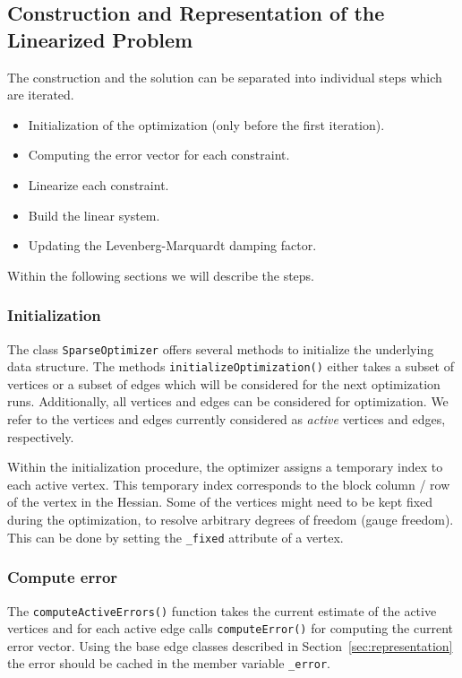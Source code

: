 \documentclass[a4paper]{article}
\begin{document}
\subsection{Construction and Representation of the Linearized Problem}
The construction and the solution can be separated into individual
steps which are iterated.
\begin{itemize}
  \item Initialization of the optimization (only before the first
    iteration).
  \item Computing the error vector for each constraint.
  \item Linearize each constraint.
  \item Build the linear system.
  \item Updating the Levenberg-Marquardt damping factor.
\end{itemize}

Within the following sections we will describe the steps.

\subsubsection{Initialization}
The class \verb+SparseOptimizer+ offers several methods to initialize
the underlying data structure. The methods
\verb+initializeOptimization()+ either takes a subset of vertices or a
subset of edges which will be considered for the next optimization runs.
Additionally, all vertices and edges can be considered for optimization.
We refer to the vertices and edges currently considered as \emph{active}
vertices and edges, respectively.

Within the initialization procedure, the optimizer assigns a temporary
index to each active vertex. This temporary index corresponds to the
block column / row of the vertex in the Hessian. Some of the vertices
might need to be kept fixed during the optimization, to resolve
arbitrary degrees of freedom (gauge freedom). This can be done by
setting the \verb+_fixed+ attribute of a vertex.

\subsubsection{Compute error\label{sec:error}}
The \verb+computeActiveErrors()+ function takes the current estimate of
the active vertices and for each active edge calls
\verb+computeError()+ for computing the current error vector. Using
the base edge classes described in Section~\ref{sec:representation} 
the error should be cached in the member variable \verb+_error+.
\end{document}
